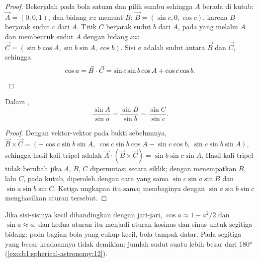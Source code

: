 \begin{proof}
Bekerjalah pada bola satuan dan pilih sumbu sehingga $A$ berada di kutub: $\vec A = (0, 0, 1)$, dan bidang $xz$ memuat $B$: $\vec B = (\sin c, 0, \cos c)$, karena $B$ berjarak sudut $c$ dari $A$. Titik $C$ berjarak sudut $b$ dari $A$, pada  yang melalui $A$ dan membentuk sudut $A$ dengan bidang $xz$: $\vec C = (\sin b\cos A, \sin b\sin A, \cos b)$. Sisi $a$ adalah sudut antara $\vec B$ dan $\vec C$, sehingga
\[
  \cos a = \vec B\cdot\vec C = \sin c\sin b\cos A + \cos c\cos b. \qedhere
\]
\end{proof}

\begin{theorem}\label{thm:b1:spherical-astronomy:sine-rule}
Dalam ,
\[
  \frac{\sin A}{\sin a} = \frac{\sin B}{\sin b} = \frac{\sin C}{\sin c}.
\]
\end{theorem}

\begin{proof}
Dengan vektor-vektor pada bukti sebelumnya,
$\vec B \times \vec C = (-\cos c\sin b\sin A,\ \cos c\sin b\cos A - \sin c\cos b,\
\sin c\sin b\sin A)$, sehingga hasil kali tripel adalah
$\vec A\cdot(\vec B\times\vec C) = \sin b\sin c\sin A$. Hasil kali tripel tidak
berubah jika $A$, $B$, $C$ dipermutasi secara siklik; dengan menempatkan $B$, lalu $C$,
pada kutub, diperoleh dengan cara yang sama $\sin c\sin a\sin B$ dan $\sin a\sin b\sin
C$. Ketiga ungkapan itu sama; membaginya dengan $\sin a\sin b\sin c$ menghasilkan aturan tersebut.
\end{proof}

Jika sisi-sisinya kecil dibandingkan dengan jari-jari, $\cos a \approx 1 -
a^2/2$ dan $\sin a \approx a$, dan kedua aturan itu menjadi aturan kosinus dan
sinus untuk segitiga bidang: pada bagian bola yang cukup kecil, bola tampak datar.
Pada segitiga yang besar keadaannya tidak demikian: jumlah sudut suatu 
lebih besar dari \ang{180} (\cref{exo:b1:spherical-astronomy:12}).

